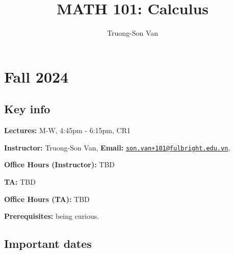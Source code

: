 \documentclass[
]{article}
\title{MATH 101: Calculus}
\author{Truong-Son Van}
\date{}
\begin{document}
\maketitle

{
\setcounter{tocdepth}{2}
\tableofcontents
}
\hypertarget{fall-2024}{%
\section*{Fall 2024}\label{fall-2024}}

\hypertarget{key-info}{%
\subsection*{Key info}\label{key-info}}

\textbf{Lectures:} M-W, 4:45pm - 6:15pm, CR1

\textbf{Instructor:} Truong-Son Van, \textbf{Email:} \href{mailto:son.van+101@fulbright.edu.vn}{\nolinkurl{son.van+101@fulbright.edu.vn}},

\textbf{Office Hours (Instructor):} TBD

\textbf{TA:} TBD

\textbf{Office Hours (TA):} TBD

\textbf{Prerequisites:} being curious.

\hypertarget{important-dates}{%
\subsection*{Important dates}\label{important-dates}}
\end{document}
